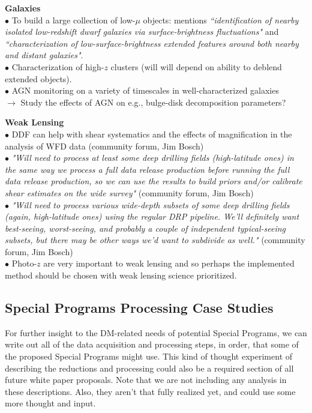 \documentclass[DM,lsstdraft,toc]{lsstdoc}
\begin{document}
\noindent \textbf{Galaxies} \\
$\bullet$ To build  a large collection of low-$\mu$ objects: \cite{FergusonWP} mentions {\it ``identification of nearby isolated low-redshift dwarf galaxies via surface-brightness fluctuations"} and {\it ``characterization of low-surface-brightness extended features around both nearby and distant galaxies"}. \\
$\bullet$ Characterization of high-$z$ clusters (will will depend on ability to deblend extended objects). \\
$\bullet$ AGN monitoring on a variety of timescales in well-characterized galaxies \citep{FergusonWP}  \citep{GawiserWP} \\
$\rightarrow$ Study the effects of AGN on e.g., bulge-disk decomposition parameters?

\noindent \textbf{Weak Lensing} \\
$\bullet$ DDF can help with shear systematics and the effects of magnification in the analysis of WFD data (community forum, Jim Bosch) \\
$\bullet$ {\it "Will need to process at least some deep drilling fields (high-latitude ones) in the same way we process a full data release production before running the full data release production, so we can use the results to build priors and/or calibrate shear estimates on the wide survey"} (community forum, Jim Bosch) \\
$\bullet$ {\it "Will need to process various wide-depth subsets of some deep drilling fields (again, high-latitude ones) using the regular DRP pipeline. We'll definitely want best-seeing, worst-seeing, and probably a couple of independent typical-seeing subsets, but there may be other ways we'd want to subdivide as well."} (community forum, Jim Bosch)  \\
$\bullet$ Photo-$z$ are very important to weak lensing \citep{MaWP} and so perhaps the implemented method should be chosen with weak lensing science prioritized.




\subsection{Special Programs Processing Case Studies}\label{ssec:science_dmsums}

For further insight to the DM-related needs of potential Special Programs, we can write out all of the data acquisition and processing steps, in order, that some of the proposed Special Programs might use. This kind of thought experiment of describing the reductions and processing could also be a required section of all future white paper proposals. Note that we are not including any analysis in these descriptions. Also, they aren't that fully realized yet, and could use some more thought and input.
\end{document}
